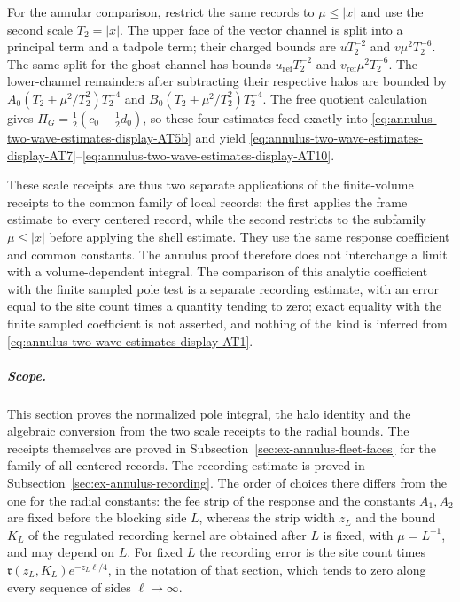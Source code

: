For the annular comparison, restrict the same records to
$\mu\leq|x|$ and use the second scale $T_2=|x|$. The upper face of the
vector channel is split
into a principal term and a tadpole term; their charged bounds are
$uT_2^{-2}$ and $v\mu^2T_2^{-6}$. The same split for the ghost channel
has bounds $u_{\mathrm{ref}}T_2^{-2}$ and
$v_{\mathrm{ref}}\mu^2T_2^{-6}$. The lower-channel
remainders after subtracting their respective halos are bounded by
$A_0(T_2+\mu^2/T_2^2)T_2^{-4}$ and
$B_0(T_2+\mu^2/T_2^2)T_2^{-4}$. The free quotient calculation gives
$\Pi_G=\frac12(c_0-\frac12d_0)$, so these four estimates feed exactly
into \eqref{eq:annulus-two-wave-estimates-display-AT5b} and yield \eqref{eq:annulus-two-wave-estimates-display-AT7}--\eqref{eq:annulus-two-wave-estimates-display-AT10}.

These scale receipts are thus two separate applications of the
finite-volume receipts to the common family of local records: the first
applies the frame estimate to every centered record, while the second
restricts to the subfamily $\mu\leq|x|$ before applying the shell
estimate. They use the same response
coefficient and common constants. The annulus proof therefore does not
interchange a limit with a volume-dependent integral. The comparison of
this analytic coefficient with the finite sampled pole test is a
separate recording estimate, with an error equal to the site count
times a quantity tending to zero; exact equality with the finite
sampled coefficient is not asserted, and nothing of the kind is
inferred from \eqref{eq:annulus-two-wave-estimates-display-AT1}.

\subparagraph{Scope.}
This section proves the normalized pole integral, the halo identity and
the algebraic conversion from the two scale receipts to the radial
bounds. The receipts themselves are proved in
Subsection~\ref{sec:ex-annulus-fleet-faces} for the family of all centered
records. The recording estimate is proved in
Subsection~\ref{sec:ex-annulus-recording}. The order of choices there
differs from the one for the radial constants: the fee strip of the
response and the constants $A_1,A_2$ are fixed before the blocking side
$L$, whereas the strip width $z_L$ and the bound $K_L$ of the regulated
recording kernel are obtained after $L$ is fixed, with $\mu=L^{-1}$,
and may depend on $L$. For fixed $L$ the recording error is the site
count times $\mathfrak r(z_L,K_L)e^{-z_L\ell/4}$, in the notation of
that section, which tends to zero along every sequence of sides
$\ell\to\infty$.
